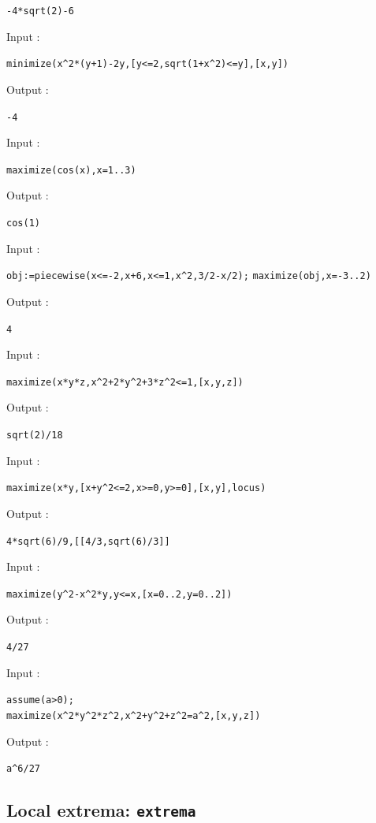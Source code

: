 \documentclass[a4paper,11pt]{book}
\begin{document}
\begin{center}
{\tt -4*sqrt(2)-6}
\end{center}
Input :
\begin{center}
{\tt minimize(x\verb|^|2*(y+1)-2y,[y<=2,sqrt(1+x\verb|^|2)<=y],[x,y])}
\end{center}
Output :
\begin{center}
{\tt -4}
\end{center}
Input :
\begin{center}
{\tt maximize(cos(x),x=1..3)}
\end{center}
Output :
\begin{center}
{\tt cos(1)}
\end{center}
Input :
\begin{center}
{\tt obj:=piecewise(x<=-2,x+6,x<=1,x\verb|^|2,3/2-x/2);}
{\tt maximize(obj,x=-3..2)}
\end{center}
Output :
\begin{center}
{\tt 4}
\end{center}
Input :
\begin{center}
{\tt maximize(x*y*z,x\verb|^|2+2*y\verb|^|2+3*z\verb|^|2<=1,[x,y,z])}
\end{center}
Output :
\begin{center}
{\tt sqrt(2)/18}
\end{center}
Input :
\begin{center}
{\tt maximize(x*y,[x+y\verb|^|2<=2,x>=0,y>=0],[x,y],locus)}
\end{center}
Output :
\begin{center}
{\tt 4*sqrt(6)/9,[[4/3,sqrt(6)/3]]}
\end{center}
Input :
\begin{center}
{\tt maximize(y\verb|^|2-x\verb|^|2*y,y<=x,[x=0..2,y=0..2])}
\end{center}
Output :
\begin{center}
{\tt 4/27}
\end{center}
Input :
\begin{center}
{\tt assume(a>0);}\\
{\tt maximize(x\verb|^|2*y\verb|^|2*z\verb|^|2,x\verb|^|2+y\verb|^|2+z\verb|^|2=a\verb|^|2,[x,y,z])}
\end{center}
Output :
\begin{center}
{\tt a\verb|^|6/27}
\end{center}

\subsection{Local extrema: {\tt extrema}}
\end{document}
